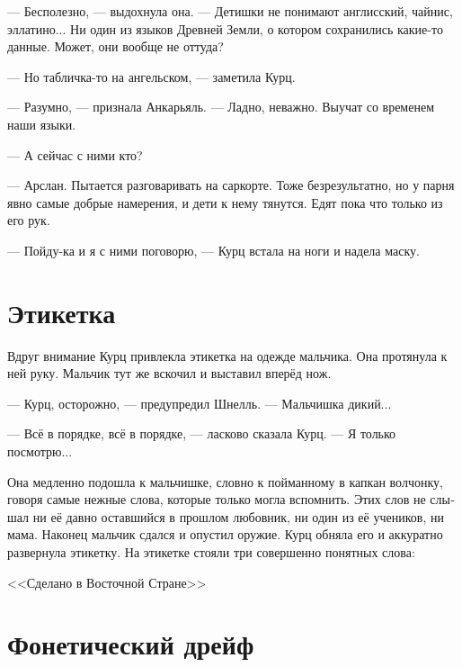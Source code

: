 \documentclass[a4paper,12pt,fleqn]{book}\usepackage{polyglossia}\setdefaultlanguage[babelshorthands=true]{russian}\setotherlanguage{english}\defaultfontfeatures{Ligatures=TeX,Mapping=tex-text}\usepackage{xcolor}\newcommand{\ml}[3]{#2}
\begin{document}
--- Бесполезно, --- выдохнула она.
\ml{$0$}
{--- Детишки не понимают англисский, чайнис, эллатино...}
{``The children don't speak Englis, Chainis, Ellatino ....}
Ни один из языков Древней Земли, о котором сохранились какие-то данные.
Может, они вообще не оттуда?

\ml{$0$}
{--- Но табличка-то на ангельском, --- заметила Курц.}
{``But that plate is written in Engels,'' Kurz noted.}

\ml{$0$}
{--- Разумно, --- признала Анкарьяль.}
{``Makes sense,'' Angaralle admitted.}
--- Ладно, неважно.
Выучат со временем наши языки.

--- А сейчас с ними кто?

\ml{$0$}
{--- Арслан.}
{``Ary\th{}lan.}
\ml{$0$}
{Пытается разговаривать на саркорте.}
{Trying to speak Sarqort to them.}
\ml{$0$}
{Тоже безрезультатно, но у парня явно самые добрые намерения, и дети к нему тянутся.}
{Result is the same, but the guy apparently has the best intentions for them, and the children reciprocate.}
\ml{$0$}
{Едят пока что только из его рук.}
{Thus far, they take food from his hands only.''}

--- Пойду-ка и я с ними поговорю, --- Курц встала на ноги и надела маску.

\section{Этикетка}

Вдруг внимание Курц привлекла этикетка на одежде мальчика.
Она протянула к ней руку.
Мальчик тут же вскочил и выставил вперёд нож.

--- Курц, осторожно, --- предупредил Шнелль.
--- Мальчишка дикий...

--- Всё в порядке, всё в порядке, --- ласково сказала Курц.
--- Я только посмотрю...

Она медленно подошла к мальчишке, словно к пойманному в капкан волчонку, говоря самые нежные слова, которые только могла вспомнить.
Этих слов не слышал ни её давно оставшийся в прошлом любовник, ни один из её учеников, ни мама.
Наконец мальчик сдался и опустил оружие.
Курц обняла его и аккуратно развернула этикетку.
На этикетке стояли три совершенно понятных слова:

\ml{$0$}
{<<Сделано в Восточной Стране>>}
{\textsc{Made in Eastern Realm}}

\section{Фонетический дрейф}
\end{document}
